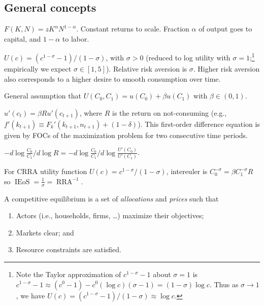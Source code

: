 \documentclass[8pt,letterpaper, landscape]{extarticle} %
\renewcommand{\ln}{\log}
\begin{document}
\begin{multicols}{3}
\begin{description}
\subsection{General concepts}
 $ F(K, N) = z K^\alpha N^{1-\alpha} $. Constant returns to scale. Fraction $ \alpha $ of output goes to capital, and $ 1 - \alpha $ to labor.

 $ U(c) = (c^{1 - \sigma} - 1) / (1 - \sigma) $, with $ \sigma > 0 $ (reduced to log utility with $ \sigma = 1 $;\footnote{Note the Taylor approximation of $ c^{1 - \sigma} - 1 $ about $ \sigma = 1 $ is $ c^{1 - \sigma} - 1 \approx (c^0 - 1) - c^{0} (\log c) (\sigma - 1) = (1 - \sigma) \ln c  $. Thus as $ \sigma \to 1 $, we have $ U(c) = (c^{1 - \sigma} - 1) / (1 - \sigma) \approx \ln c $.} empirically we expect $ \sigma \in [1,5] $). Relative risk aversion is $ \sigma $. Higher risk aversion also corresponds to a higher desire to smooth consumption over time.

 General assumption that $ U(C_0, C_1) = u(C_0) + \beta u(C_1) $ with $ \beta \in (0,1) $.

 $ u'(c_t) = \beta R u'(c_{t+1}) $, where $ R $ is the return on not-consuming (e.g., $ f'(k_{t+1}) \equiv F_{k}' (k_{t+1}, n_{t+1}) + (1 - \delta) $). This first-order difference equation is given by FOCs of the maximization problem for two consecutive time periods.

 $ - d \ln \tfrac{C_0}{C_1} / d \ln R = - d \ln \tfrac{C_0}{C_1} / d \ln \frac{U'(C_0)}{U'(C_1)} $.

For CRRA utility function $ U(c) = c^{1 - \sigma} / (1 - \sigma) $, intereuler is $ C_0^{-\sigma} = \beta C_1^{-\sigma} R $ so $ \operatorname{IEoS} = \frac{1}{\sigma} = \operatorname{RRA}^{-1} $.

 A competitive equilibrium is a set of \textit{allocations} and \textit{prices} such that
\begin{enumerate}
\item Actors (i.e., households, firms, \ldots) maximize their objectives;
\item Markets clear; and
\item Resource constraints are satisfied.
\end{enumerate}


\end{description}
\end{multicols}
\end{document}
